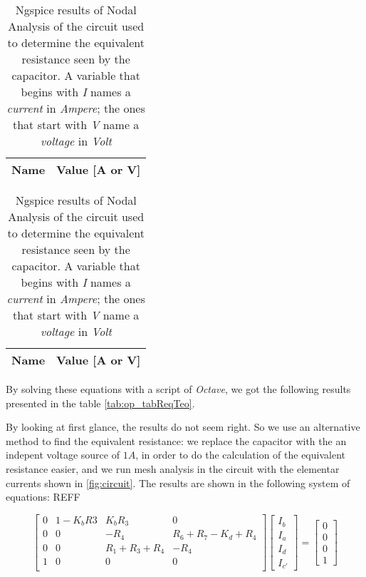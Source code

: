 \begin{table}
  \parbox{.45\linewidth}{
    \centering
    \begin{tabular}{|c|c|}
      \hline
      {\bf Name} & {\bf Value [A or V]} \\ \hline
      
    \end{tabular}
    \label{tab:op_tabReqTeo}
    \caption{Theoretical Results of Nodal Analysis of the circuit used to determine the equivalent resistance seen by the capacitor. A variable that begins  with \textit{I} names a \textit{current} in \textit{Ampere}; the ones that start with \textit{V} name a \textit{voltage} in \textit{Volt} }
  }
  \hfill
  \parbox{.45\linewidth}{
    \centering
    \begin{tabular}{|c|c|}
      {\bf Name} & {\bf Value [A or V]} \\ \hline
      
      \hline
    \end{tabular}
    \label{tab:op_tabReqSpice}
    \caption{Ngspice results of Nodal Analysis of the circuit used to determine the equivalent resistance seen by the capacitor. A variable that begins  with \textit{I} names a \textit{current} in \textit{Ampere}; the ones that start with \textit{V} name a \textit{voltage} in \textit{Volt} }
  }
\end{table}

By solving these equations with a script of \textit{Octave}, we got the following results presented in the table \ref{tab:op_tabReqTeo}.


By looking at first glance, the results do not seem right. So we use an alternative method to find the equivalent resistance: we replace the capacitor with the an indepent voltage source of $1 A$, in order to do the calculation of the equivalent resistance easier,
and we run mesh analysis in the circuit with the elementar currents shown in \ref{fig:circuit}. The results are shown in the following system of equations: REFF

\[
  \begin{bmatrix}
    0 & 1-K_b R3 & K_b R_3         & 0                     \\
    0 & 0        & -R_4            & R_6 + R_7 - K_d + R_4 \\
    0 & 0        & R_1 + R_3 + R_4 & -R_4                  \\
    1 & 0        & 0               & 0                     \\
  \end{bmatrix}
  \begin{bmatrix}
    I_b \\ I_a \\ I_d \\ I_{c'}
  \end{bmatrix}
  =
  \begin{bmatrix}
    0 \\ 0 \\ 0 \\ 1
  \end{bmatrix}
\]

